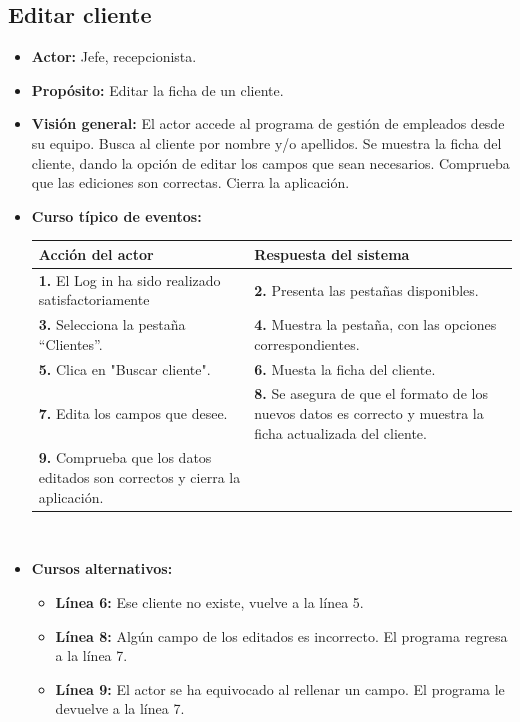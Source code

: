 \documentclass[spanish,a4paper,12pt]{report}	%
\begin{document}
	\subsection{Editar cliente}		
			\begin{itemize}
			\item \textbf{Actor:} Jefe, recepcionista.
			\item \textbf{Propósito: } Editar la ficha de un cliente.
			\item \textbf{Visión general:} El actor accede al programa de gestión de empleados desde su equipo. Busca al cliente por nombre y/o apellidos. Se muestra la ficha del cliente, dando la opción de editar los campos que sean necesarios. Comprueba que las ediciones son correctas. Cierra la aplicación. 
			\item \textbf{Curso típico de eventos:} 	\\
				\begin{tabular}{|p{6cm}||p{6cm}|}
				\hline
				\textbf{Acción del actor} & \textbf{Respuesta del sistema} \\ \hline \hline
				\textbf{1.} El Log in ha sido realizado satisfactoriamente & \textbf{2.} Presenta las pestañas disponibles.\\ \hline 
				\textbf{3.} Selecciona la pestaña “Clientes”. & \textbf{4.} Muestra la pestaña, con las opciones correspondientes. \\ \hline
				\textbf{5.} Clica en "Buscar cliente".	& \textbf{6.} Muesta la ficha del cliente. \\ \hline
				\textbf{7.} Edita los campos que desee. & \textbf{8.} Se asegura de que el formato de los nuevos datos es correcto y muestra la ficha actualizada del cliente.\\ \hline
				\textbf{9.} Comprueba que los datos editados son correctos y cierra la aplicación. & \textbf{} \\ \hline
			\end{tabular}
			\\
			\item \textbf{Cursos alternativos:} 
			\begin{itemize}
			\item  \textbf{Línea 6:} Ese cliente no existe, vuelve a la línea 5.
			\item  \textbf{Línea 8:} Algún campo de los editados es incorrecto. El programa regresa a la línea 7.
			\item  \textbf{Línea 9:} El actor se ha equivocado al rellenar un campo. El programa le devuelve a la línea 7.
			\end {itemize}
		\end{itemize}%
\end{document}
